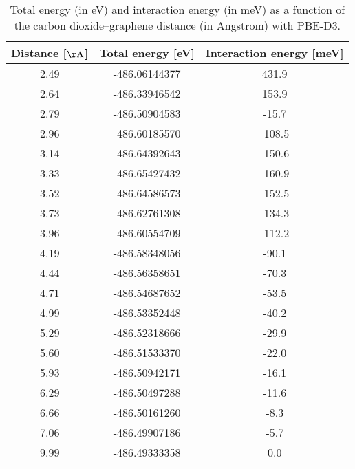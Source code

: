 \begin{table}[h]
\centering
\begin{tabular}{ccc}
\hline
Distance [$\mathrm{\AA}$] & Total energy [eV] & Interaction energy [meV] \\
\hline
2.49 & -486.06144377 & 431.9 \\
2.64 & -486.33946542 & 153.9 \\
2.79 & -486.50904583 & -15.7 \\
2.96 & -486.60185570 & -108.5 \\
3.14 & -486.64392643 & -150.6 \\
3.33 & -486.65427432 & -160.9 \\
3.52 & -486.64586573 & -152.5 \\
3.73 & -486.62761308 & -134.3 \\
3.96 & -486.60554709 & -112.2 \\
4.19 & -486.58348056 & -90.1 \\
4.44 & -486.56358651 & -70.3 \\
4.71 & -486.54687652 & -53.5 \\
4.99 & -486.53352448 & -40.2 \\
5.29 & -486.52318666 & -29.9 \\
5.60 & -486.51533370 & -22.0 \\
5.93 & -486.50942171 & -16.1 \\
6.29 & -486.50497288 & -11.6 \\
6.66 & -486.50161260 & -8.3 \\
7.06 & -486.49907186 & -5.7 \\
9.99 & -486.49333358 & 0.0 \\
\hline
\end{tabular}
\caption{Total energy (in eV) and interaction energy (in meV) as a function of the carbon dioxide--graphene distance (in Angstrom) with PBE-D3.}
\label{SI_dft_table_PBE-D3}
\end{table}